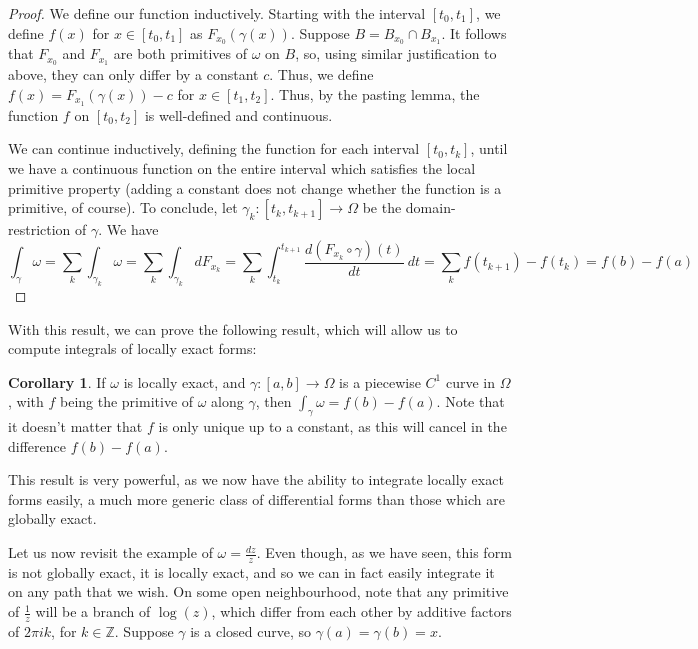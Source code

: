\documentclass[aps,pra,showpacs,notitlepage,onecolumn,superscriptaddress,nofootinbib]{revtex4-1}
\theoremstyle{definition}
\newtheorem{corollary}{Corollary}[theorem]
\begin{document}
\begin{proof}
  We define our function inductively. Starting with the interval $[t_0, t_1]$, we define $f(x)$ for $x \in [t_0, t_1]$ as $F_{x_0}(\gamma(x))$.
  Suppose $B = B_{x_0} \cap B_{x_1}$. It follows that $F_{x_0}$ and $F_{x_1}$ are both primitives of $\omega$ on $B$, so, using similar justification
  to above, they can only differ by a constant $c$. Thus, we define $f(x) = F_{x_1}(\gamma(x)) - c$ for $x \in [t_1, t_2]$. Thus, by the pasting lemma,
  the function $f$ on $[t_0, t_2]$ is well-defined and continuous.

  We can continue inductively, defining the function for each interval $[t_0, t_k]$, until we have a continuous function on the entire interval which satisfies
  the local primitive property (adding a constant does not change whether the function is a primitive, of course). To conclude, let $\gamma_k : [t_k, t_{k + 1}] \rightarrow \Omega$
  be the domain-restriction of $\gamma$. We have
  \begin{equation}
    \displaystyle\int_{\gamma} \omega = \displaystyle\sum_{k} \displaystyle\int_{\gamma_k} \omega = \displaystyle\sum_{k} \displaystyle\int_{\gamma_k} dF_{x_k} = \displaystyle\sum_{k} \displaystyle\int_{t_k}^{t_{k+1}}
    \frac{ d (F_{x_k} \circ \gamma)(t)}{dt} \ dt = \displaystyle\sum_{k} f(t_{k + 1}) - f(t_{k}) = f(b) - f(a)
    \end{equation}
\end{proof}

\noindent With this result, we can prove the following result, which will allow us to compute integrals of locally exact forms:

\begin{corollary}
  \label{cor:loc_ex}
  If $\omega$ is locally exact, and $\gamma : [a, b] \rightarrow \Omega$ is a piecewise $C^1$ curve in $\Omega$, with $f$ being the primitive of $\omega$ along $\gamma$, then $\int_{\gamma} \omega = f(b) - f(a)$. Note that
  it doesn't matter that $f$ is only unique up to a constant, as this will cancel in the difference $f(b) - f(a)$.
\end{corollary}

\noindent This result is very powerful, as we now have the ability to integrate locally exact forms easily, a much more generic class of differential forms than those which are globally exact.
\newline

\noindent Let us now revisit the example of $\omega = \frac{dz}{z}$. Even though, as we have seen, this form is not globally exact, it is locally exact, and so we can in fact easily integrate it on
any path that we wish. On some open neighbourhood, note that any primitive of $\frac{1}{z}$ will be a branch of $\log(z)$, which differ from each other by additive factors of $2\pi i k$, for $k \in \mathbb{Z}$.
Suppose $\gamma$ is a closed curve, so $\gamma(a) = \gamma(b) = x$.
\end{document}
